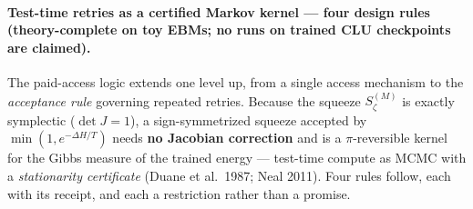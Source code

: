 \documentclass[11pt]{article}
\newcommand{\detJ}{\det J}
\begin{document}
\paragraph{Test-time retries as a certified Markov kernel --- four design rules (theory-complete on toy EBMs; no runs on trained CLU checkpoints are claimed).} The paid-access logic extends one level up, from a single access mechanism to the \emph{acceptance rule} governing repeated retries. Because the squeeze $S^{(M)}_\zeta$ is exactly symplectic ($\detJ=1$), a sign-symmetrized squeeze accepted by $\min(1,e^{-\Delta H/T})$ needs \textbf{no Jacobian correction} and is a $\pi$-reversible kernel for the Gibbs measure of the trained energy --- test-time compute as MCMC with a \emph{stationarity certificate} (Duane et al.\ 1987; Neal 2011). Four rules follow, each with its receipt, and each a restriction rather than a promise.
\end{document}
